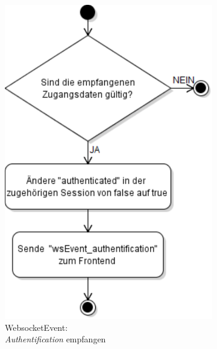 \begin{figure}[ht]
  \begin{subfigure}[b]{0.406343284\textwidth}
    \centering
    \includegraphics[width=\textwidth]{content/hauptteil/systemEntwurf/res/wsHandler/backend/wsEvent_authentification.pdf}
    \caption{WebsocketEvent:\\\emph{Authentification} empfangen}
    \label{fig:aDDB:wsEvent_authentification}
  \end{subfigure}
  \hfill
  \begin{subfigure}[b]{0.583656716\textwidth}
    \centering

\end{subfigure}
\end{figure}
